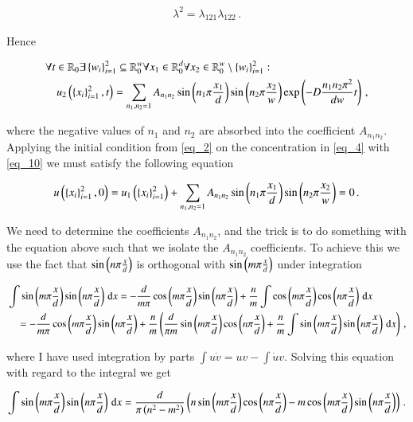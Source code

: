 \documentclass[11pt,english,a4paper]{article}
\begin{document}
\begin{flushleft}
\begin{align*}
\lambda^2 = \lambda_{121}\lambda_{122}\,.
\end{align*}

Hence

\begin{align}
&\forall t\in \mathbb{R}_0\exists\left\lbrace{w_i}\right\rbrace_{i=1}^2\subseteq \mathbb{R}_0^w \forall x_1\in \mathbb{R}_{0}^d \forall x_2\in\mathbb{R}_0^w \setminus \left\lbrace{w_i}\right\rbrace_{i=1}^2 : 
\nonumber\\
&\quad u_2\left({\left\lbrace{x_i}\right\rbrace_{i=1}^2,t}\right) = \sum_{n_1,n_2=1} A_{n_1 n_2} \sin\left({n_1\pi \frac{x_1}{d}}\right) \sin\left({n_2\pi \frac{x_2}{w}}\right) \exp\left({-D\frac{n_1 n_2 \pi^2}{dw} t}\right)\,,
\label{eq_10}
\end{align}

where the negative values of $n_1$ and $n_2$ are absorbed into the coefficient $A_{n_1 n_2}$. Applying the initial condition from \eqref{eq_2} on the concentration in \eqref{eq_4} with \eqref{eq_10} we must satisfy the following equation

\begin{align}
u\left({\left\lbrace{x_i}\right\rbrace_{i=1}^2,0}\right) = u_1\left({\left\lbrace{x_i}\right\rbrace_{i=1}^2}\right)+ \sum_{n_1,n_2=1} A_{n_1 n_2} \sin\left({n_1\pi \frac{x_1}{d}}\right) \sin\left({n_2\pi \frac{x_2}{w}}\right)= 0 \,.
\label{eq_11}
\end{align}

We need to determine the coefficients $A_{n_1 n_2}$, and the trick is to do something with the equation above such that we isolate the $A_{n_1 n_2}$ coefficients. To achieve this we use the fact that $\sin\left({n\pi\frac{x}{d}}\right)$ is orthogonal with $\sin\left({m\pi\frac{x}{d}}\right)$ under integration 

\begin{align*}
&\int \sin\left({m\pi\frac{x}{d}}\right)\sin\left({n\pi\frac{x}{d}}\right)\,\mathrm{d}x = -\frac{d}{m\pi}\cos\left({m\pi\frac{x}{d}}\right)\sin\left({n\pi\frac{x}{d}}\right) + \frac{n}{m}\int \cos\left({m\pi\frac{x}{d}}\right)\cos\left({n\pi\frac{x}{d}}\right)\,\mathrm{d}x
\\
&\quad = -\frac{d}{m\pi}\cos\left({m\pi\frac{x}{d}}\right)\sin\left({n\pi\frac{x}{d}}\right) + \frac{n}{m}\left({\frac{d}{\pi m} \sin\left({m\pi\frac{x}{d}}\right) \cos\left({n\pi\frac{x}{d}}\right) + \frac{n}{m}\int \sin\left({m\pi\frac{x}{d}}\right)\sin\left({n\pi\frac{x}{d}}\right)\,\mathrm{d}x}\right) \,,
\end{align*}

where I have used integration by parts $\int u\dot{v} = uv - \int \dot{u}v$. Solving this equation with regard to the integral we get

\begin{align*}
\int \sin\left({m\pi\frac{x}{d}}\right)\sin\left({n\pi\frac{x}{d}}\right)\,\mathrm{d}x = \frac{d}{\pi\left({n^2 - m^2}\right)} \left({n \sin\left({m\pi\frac{x}{d}}\right)\cos\left({n\pi\frac{x}{d}}\right) - m \cos\left({m\pi\frac{x}{d}}\right)\sin\left({n\pi\frac{x}{d}}\right)}\right) \,.
\end{align*}


\end{flushleft}
\end{document}
